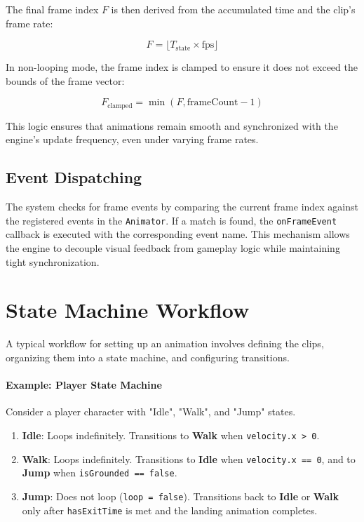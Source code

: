 The final frame index $F$ is then derived from the accumulated time and the clip's frame rate:

\begin{equation}
F = \lfloor T_{\text{state}} \times \text{fps} \rfloor
\end{equation}

In non-looping mode, the frame index is clamped to ensure it does not exceed the bounds of the frame vector:

\begin{equation}
F_{\text{clamped}} = \min(F, \text{frameCount} - 1)
\end{equation}

This logic ensures that animations remain smooth and synchronized with the engine's update frequency, even under varying frame rates.

\subsection{Event Dispatching}

The system checks for frame events by comparing the current frame index against the registered events in the \texttt{Animator}. If a match is found, the \texttt{onFrameEvent} callback is executed with the corresponding event name. This mechanism allows the engine to decouple visual feedback from gameplay logic while maintaining tight synchronization.

\section{State Machine Workflow}

A typical workflow for setting up an animation involves defining the clips, organizing them into a state machine, and configuring transitions.


\paragraph{Example: Player State Machine}

Consider a player character with "Idle", "Walk", and "Jump" states.
\begin{enumerate}
    \item \textbf{Idle}: Loops indefinitely. Transitions to \textbf{Walk} when \texttt{velocity.x > 0}.
    \item \textbf{Walk}: Loops indefinitely. Transitions to \textbf{Idle} when \texttt{velocity.x == 0}, and to \textbf{Jump} when \texttt{isGrounded == false}.
    \item \textbf{Jump}: Does not loop (\texttt{loop = false}). Transitions back to \textbf{Idle} or \textbf{Walk} only after \texttt{hasExitTime} is met and the landing animation completes.
\end{enumerate}



